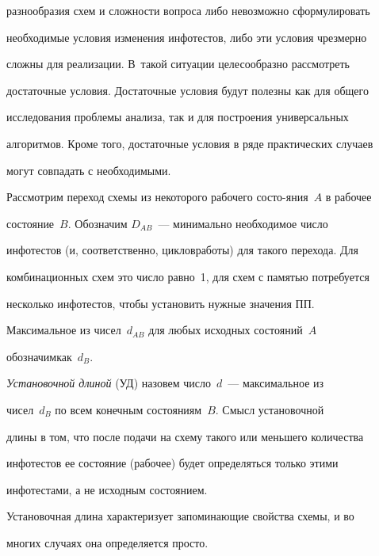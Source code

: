 разнообразия схем и сложности вопроса либо невозможно сформулировать 


необходимые условия изменения инфотестов, либо эти условия чрезмерно 


сложны для реализации. В~такой ситуации целесообразно рассмотреть 


достаточные условия. Достаточные условия будут полезны как для общего 


исследования проблемы анализа, так и для построения универсальных 


алгоритмов. Кроме того, достаточные условия в ряде практических случаев 


могут совпадать с необходимыми.





Рассмотрим переход схемы из некоторого рабочего состо-\linebreak яния~$A$ в рабочее 


состояние~$B$. Обозначим $D_{AB}$~--- мини\-маль\-но необходимое число 


инфотестов (и, соответственно, циклов\linebreak работы) для такого перехода. Для 


комбинационных схем это число равно~1, для схем с памятью потребуется 


несколько инфотестов, чтобы установить нужные значения ПП. 


Максимальное из чисел~$d_{AB}$ для любых исходных состояний~$A$ 


обозначим\linebreak как~$d_B$.





\textit{Установочной длиной} (УД) назовем число~$d$~--- максимальное из 


чисел~$d_B$ по всем конечным состояниям~$B$. Смысл установочной 


длины в том, что после подачи на схему такого или меньшего количества 


инфотестов ее состояние  (рабочее) будет определяться только этими 


инфотестами, а не исходным состоянием.





Установочная длина характеризует запоминающие свойства схемы, и во 


многих случаях она определяется просто.





